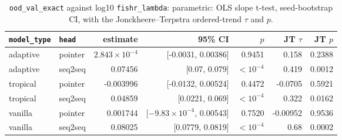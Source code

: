 \documentclass[10pt]{article}
\begin{document}
{\small
\begin{longtable}{llrrrrr}
\caption{\texttt{ood\_val\_exact} against log10 \texttt{fishr\_lambda}: parametric: OLS slope t-test, seed-bootstrap CI, with the Jonckheere--Terpstra ordered-trend $\tau$ and $p$.}\label{tab:trend-ood_val_exact}\\
\toprule
\texttt{model\_type} & \texttt{head} & estimate & 95\% CI & $p$ & JT $\tau$ & JT $p$\\
\midrule
\endhead
adaptive & pointer & $2.843\times10^{-4}$ & [-0.0031, 0.00386] & 0.9451 & 0.158 & 0.2388\\
adaptive & seq2seq & 0.07456 & [0.07, 0.079] & $<10^{-4}$ & 0.419 & 0.0012\\
tropical & pointer & -0.003996 & [-0.0132, 0.00524] & 0.4472 & -0.0705 & 0.5921\\
tropical & seq2seq & 0.04859 & [0.0221, 0.069] & $<10^{-4}$ & 0.322 & 0.0162\\
vanilla & pointer & 0.001744 & [$-9.83\times10^{-4}$, 0.00543] & 0.7520 & -0.00952 & 0.9536\\
vanilla & seq2seq & 0.08025 & [0.0779, 0.0819] & $<10^{-4}$ & 0.68 & 0.0002\\
\bottomrule
\end{longtable}
}
\end{document}
